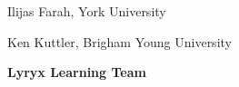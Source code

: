 {\small

\begin{center}
Ilijas Farah, York University
\smallskip

Ken Kuttler, Brigham Young University
\smallskip


\bigskip
\textbf{Lyryx Learning Team}
\vspace{-1em}

\end{center}

}

\vfill


%
%
%
%
%

